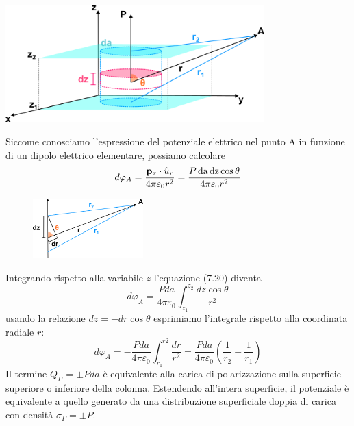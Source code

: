 \begin{center}
	\includegraphics[width = 10cm]{images/polfield}
\end{center}
Siccome conosciamo l'espressione del potenziale elettrico nel punto A in funzione di un dipolo elettrico elementare, possiamo calcolare 
\begin{equation}
	d \varphi_{A} = \frac{\bold{p}_{\tau} \cdot \hat{u}_{r}}{ 4 \pi \varepsilon_0 r^2} = \frac{P\,\text{da}\, \text{dz} \cos \theta }{4 \pi \varepsilon_0 r^2}
\end{equation}

\begin{figure} %
    \centering
    \includegraphics[width=0.38\textwidth]{images/anglerel} %
\end{figure}
Integrando rispetto alla variabile $z$  l'equazione  (7.20) diventa 
\begin{equation*}
	d \varphi_{A} = \frac{Pda}{4 \pi \varepsilon_0} \int_{z_1}^{z_2} \frac{dz \cos\theta}{r^2}
\end{equation*}
usando la relazione $dz = - dr \cos\theta$ esprimiamo l'integrale rispetto alla coordinata radiale $r$:
\begin{equation}
	d \varphi_{A} = - \frac{Pda}{4 \pi \varepsilon_0} \int_{r_1}^{r2} \frac{dr}{r^2} = \frac{Pda}{4 \pi \varepsilon_0} \left(\frac{1}{r_2} - \frac{1}{r_1}\right)
\end{equation}
Il termine $Q_P^{\pm} = \pm Pda$ \`e equivalente alla carica di polarizzazione sulla superficie superiore o inferiore della colonna. Estendendo all'intera superficie, il potenziale \`e equivalente a quello generato da una distribuzione superficiale doppia di carica con densit\`a $\sigma_{P} = \pm P$.

